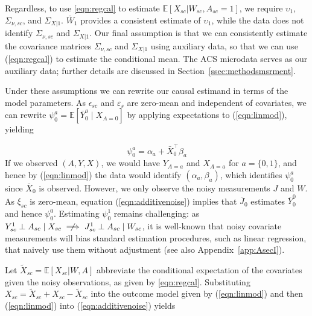 \documentclass[aoas]{imsart}
\theoremstyle{plain}
\theoremstyle{remark}
\begin{document}
Regardless, to use \eqref{eqn:regcal} to estimate $\mathbb{E}[X_{sc}|W_{sc}, A_{sc}=1]$, we require $\upsilon_1$, $\Sigma_{\nu,sc}$, and $\Sigma_{X|1}$. $\bar{W}_1$ provides a consistent estimate of $\upsilon_1$, while the data does not identify $\Sigma_{\nu,sc}$ and $\Sigma_{X|1}$. Our final assumption is that we can consistently estimate the covariance matrices $\Sigma_{\nu,sc}$ and $\Sigma_{X|1}$ using auxiliary data, so that we can use (\ref{eqn:regcal}) to estimate the conditional mean. The ACS microdata serves as our auxiliary data; further details are discussed in Section~\ref{ssec:methodsmsrment}.

Under these assumptions we can rewrite our causal estimand in terms of the model parameters. As $\epsilon_{sc}$ and $\varepsilon_s$ are zero-mean and independent of covariates,  we can rewrite $\psi_0^a = \mathbb{E}[\bar{Y}_0^a \mid X_{A=0}]$ by applying expectations to (\ref{eqn:linmod}), yielding

\begin{equation}\label{eqn:outcome}
\psi_0^a = \alpha_a + \bar{X}_0^\top\beta_a
\end{equation}
If we observed $(A,Y,X)$, we would have $Y_{A=a}$ and $X_{A=a}$ for $a=\{0,1\}$, and hence by (\ref{eqn:linmod}) the data would identify $(\alpha_a, \beta_a)$, which identifies $\psi_0^a$ since $\bar{X}_0$ is observed. However, we only observe the noisy measurements $J$ and $W$. As $\xi_{sc}$ is zero-mean, equation (\ref{eqn:additivenoise}) implies that $\bar{J}_0$ estimates $\bar{Y}_0^0$ and hence $\psi_0^0$. Estimating $\psi_0^1$ remains challenging: as $Y_{sc}^1 \perp A_{sc} \mid X_{sc} \centernot\implies J_{sc}^1 \perp A_{sc} \mid W_{sc}$, it is well-known that noisy covariate measurements will bias standard estimation procedures, such as linear regression, that naively use them without adjustment (see also Appendix~\ref{app:AsecI}).

Let $\tilde{X}_{sc} = \mathbb{E}[X_{sc} |W, A]$ abbreviate the conditional expectation of the covariates given the noisy observations, as given by \eqref{eqn:regcal}. Substituting $X_{sc} = \tilde{X}_{sc} + X_{sc} - \tilde{X}_{sc}$ into the outcome model given by (\ref{eqn:linmod}) and then (\ref{eqn:linmod}) into (\ref{eqn:additivenoise}) yields
\end{document}
